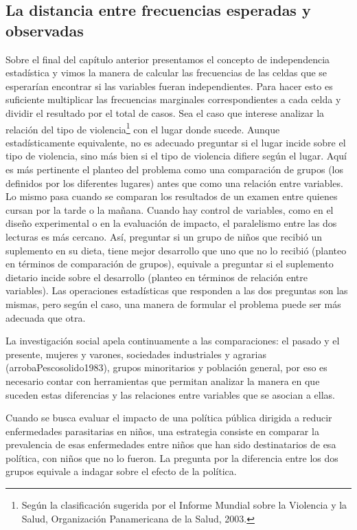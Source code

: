 \documentclass[]{book}
\let\rmarkdownfootnote\footnote%
\def\footnote{\protect\rmarkdownfootnote}
\begin{document}
\hypertarget{la-distancia-entre-frecuencias-esperadas-y-observadas}{%
\subsection{La distancia entre frecuencias esperadas y observadas}\label{la-distancia-entre-frecuencias-esperadas-y-observadas}}

Sobre el final del capítulo anterior presentamos el concepto de
independencia estadística y vimos la manera de calcular las frecuencias
de las celdas que se esperarían encontrar si las variables fueran
independientes. Para hacer esto es suficiente multiplicar las
frecuencias marginales correspondientes a cada celda y dividir el
resultado por el total de casos. Sea el caso que interese analizar la
relación del tipo de violencia\footnote{Según la clasificación sugerida por el Informe Mundial sobre la Violencia y la Salud, Organización Panamericana de la Salud, 2003.} con el lugar donde sucede. Aunque
estadísticamente equivalente, no es adecuado preguntar si el lugar
incide sobre el tipo de violencia, sino más bien si el tipo de violencia
difiere según el lugar. Aquí es más pertinente el planteo del problema
como una comparación de grupos (los definidos por los diferentes
lugares) antes que como una relación entre variables. Lo mismo pasa
cuando se comparan los resultados de un examen entre quienes cursan por
la tarde o la mañana. Cuando hay control de variables, como en el diseño
experimental o en la evaluación de impacto, el paralelismo entre las dos
lecturas es más cercano. Así, preguntar si un grupo de niños que recibió
un suplemento en su dieta, tiene mejor desarrollo que uno que no lo
recibió (planteo en términos de comparación de grupos), equivale a
preguntar si el suplemento dietario incide sobre el desarrollo (planteo
en términos de relación entre variables). Las operaciones estadísticas
que responden a las dos preguntas son las mismas, pero según el caso,
una manera de formular el problema puede ser más adecuada que otra.

La investigación social apela continuamente a las comparaciones: el pasado y el presente, mujeres y varones, sociedades industriales y agrarias (arrobaPescosolido1983), grupos minoritarios y población general, por eso es necesario contar con herramientas que permitan analizar la manera en que suceden estas diferencias y las relaciones entre variables que se asocian a ellas.

Cuando se busca evaluar el impacto de una política pública dirigida a reducir enfermedades parasitarias en niños, una estrategia consiste en comparar la prevalencia de esas enfermedades entre niños que han sido destinatarios de esa política, con niños que no lo fueron. La pregunta por la diferencia entre los dos grupos equivale a indagar sobre el efecto de la política.
\end{document}
